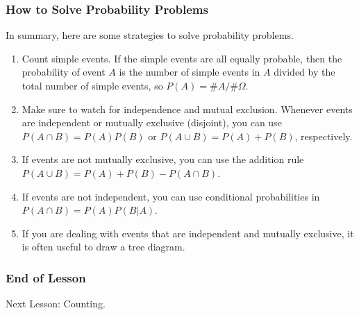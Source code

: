 \documentclass[xcolor=dvipsnames]{beamer}
\begin{document}
\begin{frame}
  \frametitle{How to Solve Probability Problems}
In summary, here are some strategies to solve probability problems.
\begin{enumerate}
\item<1-> Count simple events. If the simple events are all equally
  probable, then the probability of event $A$ is the number of simple
  events in $A$ divided by the total number of simple events, so
  $P(A)=\#A/\#\Omega$.
\item<2-> Make sure to watch for independence and mutual exclusion.
  Whenever events are independent or mutually exclusive (disjoint),
  you can use $P(A\cap{}B)=P(A)P(B)$ or $P(A\cup{}B)=P(A)+P(B)$,
  respectively.
\item<3-> If events are not mutually exclusive, you can use the
  addition rule $P(A\cup{}B)=P(A)+P(B)-P(A\cap{}B)$.
\item<4-> If events are not independent, you can use conditional
  probabilities in $P(A\cap{}B)=P(A)P(B|A)$.
\item<5-> If you are dealing with events that are independent and
  mutually exclusive, it is often useful to draw a tree diagram.
\end{enumerate}
\end{frame}

\begin{frame}
  \frametitle{End of Lesson}
Next Lesson: Counting.
\end{frame}
\end{document}
